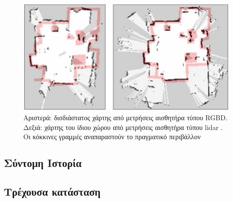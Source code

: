 \begin{figure}\centering
  \includegraphics[scale=0.5]{./figures/01.01.mobile_robotics/rgbd_lidar_map.png}
  \caption{\small Αριστερά: δισδιάστατος χάρτης από μετρήσεις αισθητήρα τύπου RGBD.
           Δεξιά: χάρτης του ίδιου χώρου από μετρήσεις αισθητήρα τύπου lidar
           \cite{Oliver2012}. Οι κόκκινες γραμμές αναπαραστούν το πραγματικό
           περιβάλλον}
  \label{fig:rgbd_lidar_map}
\end{figure}







\subsection{Σύντομη Ιστορία}

\subsection{Τρέχουσα κατάσταση}
